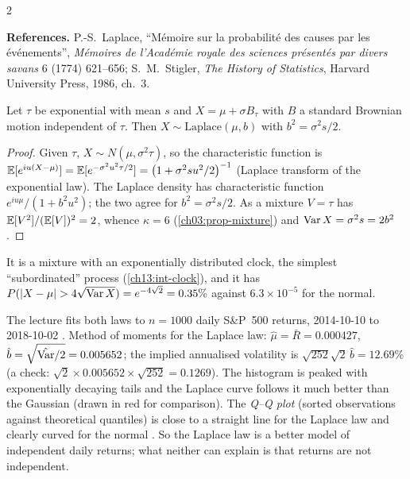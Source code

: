 \begin{paracol}{2}
\begin{history}
\textbf{References.} P.-S.~Laplace, ``Mémoire sur la probabilité des causes par les événements'', \emph{Mémoires de l'Académie royale des sciences présentés par divers savans} 6 (1774) 621--656; S.~M.~Stigler, \emph{The History of Statistics}, Harvard University Press, 1986, ch.~3.
\end{history}

\begin{proposition}\label{ch13:prop-laplace}
Let $\tau$ be exponential with mean $s$ and $X=\mu+\sigma B_\tau$ with $B$ a standard Brownian motion independent of $\tau$. Then $X\sim\mathrm{Laplace}(\mu,b)$ with $b^2=\sigma^2s/2$.
\end{proposition}
\begin{proof}
Given $\tau$, $X\sim N(\mu,\sigma^2\tau)$, so the characteristic function is $\mathbb{E}[e^{iu(X-\mu)}]=\mathbb{E}[e^{-\sigma^2u^2\tau/2}]=\bigl(1+\sigma^2su^2/2\bigr)^{-1}$
(Laplace transform of the exponential law). The Laplace density has characteristic function $e^{iu\mu}/(1+b^2u^2)$; the two agree for $b^2=\sigma^2s/2$. As a mixture
$V=\tau$ has $\mathbb{E}[V^2]/(\mathbb{E}[V])^2=2$, whence $\kappa=6$ (\cref{ch03:prop-mixture}) and $\operatorname{Var} X=\sigma^2s=2b^2$.
\end{proof}
It is a mixture with an exponentially distributed clock, the simplest ``subordinated'' process (\cref{ch13:int-clock}), and it has
$P(|X-\mu|>4\sqrt{\Var X})=e^{-4\sqrt2}=0.35\%$ against $6.3\times10^{-5}$ for the normal.

\begin{casestudy}\label{ch13:cs-laplace}
The lecture fits both laws to $n=1000$ daily S\&P~500 returns, 2014-10-10 to 2018-10-02 . Method of moments for the Laplace law:
$\hat\mu=\bar R=0.000427$, $\hat b=\sqrt{\hat{\operatorname{Var}}/2}=0.005652$; the implied annualised volatility is $\sqrt{252}\sqrt2\,\hat b=12.69\%$ (a check: $\sqrt2\times0.005652\times\sqrt{252}=0.1269$). The
histogram is peaked with exponentially decaying tails and the Laplace curve follows it much better than the Gaussian (drawn in red for comparison). The \emph{Q--Q plot} (sorted observations against theoretical quantiles) is
close to a straight line for the Laplace law and clearly curved for the normal . So the Laplace law is a better model of independent daily returns;
what neither can explain is that returns are not independent.
\end{casestudy}


\end{paracol}
